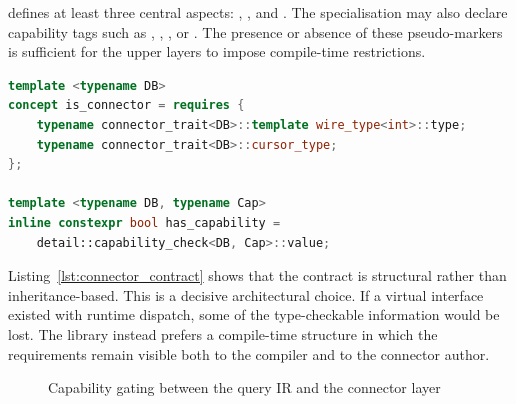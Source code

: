  defines at least three central aspects: , , and . The specialisation may also declare capability tags such as , , , or . The presence or absence of these pseudo-markers is sufficient for the upper layers to impose compile-time restrictions.

\begin{lstlisting}[language=C++,caption={Excerpt from the formal connector contract},label={lst:connector_contract}]
template <typename DB>
concept is_connector = requires {
    typename connector_trait<DB>::template wire_type<int>::type;
    typename connector_trait<DB>::cursor_type;
};

template <typename DB, typename Cap>
inline constexpr bool has_capability =
    detail::capability_check<DB, Cap>::value;
\end{lstlisting}

Listing~\ref{lst:connector_contract} shows that the contract is structural rather than inheritance-based. This is a decisive architectural choice. If a virtual interface existed with runtime dispatch, some of the type-checkable information would be lost. The library instead prefers a compile-time structure in which the requirements remain visible both to the compiler and to the connector author.

\begin{figure}[H]
\centering
{}
\caption{Capability gating between the query IR and the connector layer}
\label{fig:capability_gating}
\end{figure}

